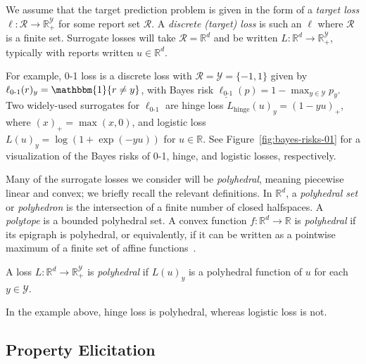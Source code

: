 \documentclass[twoside,11pt]{article}
\newcommand{\Comments}{1}
\newcommand{\mynote}[2]{\ifnum\Comments=1\textcolor{#1}{#2}\fi}
\newcommand{\jessie}[1]{\mynote{teal}{[JF: #1]}}
\newcommand{\reals}{\mathbb{R}}
\newcommand{\simplex}{\Delta_\Y}
\newcommand{\R}{\mathcal{R}}
\newcommand{\U}{\mathcal{U}}
\newcommand{\Y}{\mathcal{Y}}
\newcommand{\risk}[1]{\underline{#1}}
\newcommand{\ones}{\mathbbm{1}}
\newcommand{\Ind}[1]{\ones\{#1\}}
\newcommand{\hinge}{L_{\mathrm{hinge}}}
\newcommand{\ellzo}{\ell_{\text{0-1}}}
\begin{document}
We assume that the target prediction problem is given in the form of a \emph{target loss} $\ell:\R\to\reals^\Y_+$ for some report set $\R$.
A \emph{discrete (target) loss} is such an $\ell$ where $\R$ is a finite set.
Surrogate losses will take $\R = \reals^d$ and be written $L:\reals^d\to\reals^\Y_+$, typically with reports written $u\in\reals^d$.

For example, 0-1 loss is a discrete loss with $\R = \Y = \{-1,1\}$
given by $\ellzo(r)_y = \Ind{r \neq y}$, with Bayes risk $\risk{\ellzo}(p) = 1-\max_{y\in\Y} p_y$.
Two widely-used surrogates for $\ellzo$ are hinge loss $\hinge(u)_y = (1-yu)_+$, where $(x)_+ = \max(x,0)$, and logistic loss $L(u)_y = \log(1+\exp(-yu))$ for $u\in\reals$.
See Figure~\ref{fig:bayes-risks-01} for a visualization of the Bayes risks of 0-1, hinge, and logistic losses, respectively.

Many of the surrogate losses we consider will be \emph{polyhedral}, meaning piecewise linear and convex; we briefly recall the relevant definitions.
In $\reals^d$, a \emph{polyhedral set} or \emph{polyhedron} is the intersection of a finite number of closed halfspaces.
A \emph{polytope} is a bounded polyhedral set.
A convex function $f:\reals^d\to\reals$ is \emph{polyhedral} if its epigraph is polyhedral, or equivalently, if it can be written as a pointwise maximum of a finite set of affine functions~\citep{rockafellar1997convex}.
%
\begin{definition}
  A loss $L: \reals^d \to \reals^{\Y}_+$ is \emph{polyhedral} if $L(u)_y$ is a polyhedral function of $u$ for each $y\in\Y$.
\end{definition}
\noindent
In the example above, hinge loss is polyhedral, whereas logistic loss is not.

\subsection{Property Elicitation}
\label{sec:property-elicitation}
\end{document}
